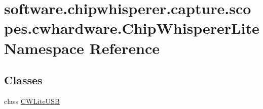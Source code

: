 \hypertarget{namespacesoftware_1_1chipwhisperer_1_1capture_1_1scopes_1_1cwhardware_1_1ChipWhispererLite}{}\section{software.\+chipwhisperer.\+capture.\+scopes.\+cwhardware.\+Chip\+Whisperer\+Lite Namespace Reference}
\label{namespacesoftware_1_1chipwhisperer_1_1capture_1_1scopes_1_1cwhardware_1_1ChipWhispererLite}
\subsection*{Classes}
\begin{DoxyCompactItemize}
\item 
class \hyperlink{classsoftware_1_1chipwhisperer_1_1capture_1_1scopes_1_1cwhardware_1_1ChipWhispererLite_1_1CWLiteUSB}{C\+W\+Lite\+U\+S\+B}
\end{DoxyCompactItemize}
